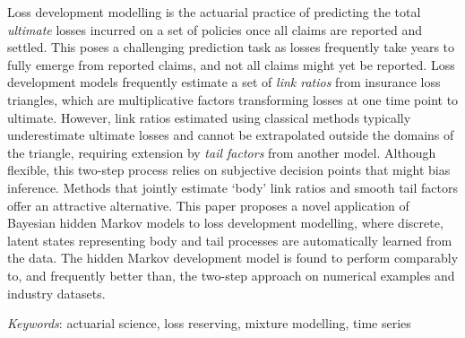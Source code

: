 Loss development modelling is the actuarial practice of predicting the 
total \textit{ultimate} losses incurred on a set of policies once all 
claims are reported and settled. This poses a challenging prediction 
task as losses frequently take years to fully emerge from 
reported claims, and not all claims might yet be reported.
Loss development models frequently estimate a set of 
\textit{link ratios} from insurance loss triangles, which are multiplicative 
factors transforming losses at one time point to ultimate. However, 
link ratios estimated using classical methods typically underestimate 
ultimate losses and cannot be extrapolated outside the domains of the 
triangle, requiring extension by \textit{tail factors} from another model. 
Although flexible, this two-step process relies on
subjective decision points that might bias inference.
Methods that jointly estimate `body’ link ratios and 
smooth tail factors offer an attractive 
alternative. This paper proposes a novel application of Bayesian 
hidden Markov models to loss development modelling, where discrete, 
latent states representing body and tail processes are automatically 
learned from the data. The hidden Markov development model 
is found to perform comparably to, and frequently better than, the 
two-step approach on numerical examples and industry datasets.

\textit{Keywords}: actuarial science, loss reserving, mixture modelling, time series
